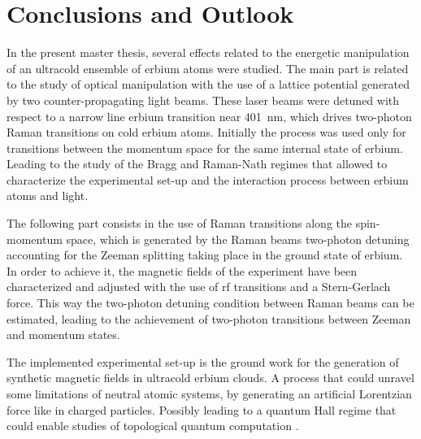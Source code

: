 
\chapter{Conclusions and Outlook}
\label{chap:outlook}

In the present master thesis, several effects related to the energetic manipulation of an ultracold ensemble of erbium atoms were studied. The main part is related to the study of optical manipulation with the use of a lattice potential generated by two counter-propagating light beams. These laser beams were detuned with respect to a narrow line erbium transition near \SI{401}{\nano\meter}, which drives two-photon Raman transitions on cold erbium atoms. Initially the process was used only for transitions between the momentum space for the same internal state of erbium. Leading to the study of the Bragg and Raman-Nath regimes that allowed to characterize the experimental set-up and the interaction process between erbium atoms and light.

The following part consists in the use of Raman transitions along the spin-momentum space, which is generated by the Raman beams two-photon detuning accounting for the Zeeman splitting taking place in the ground state of erbium. In order to achieve it, the magnetic fields of the experiment have been characterized and adjusted with the use of \acl{rf} transitions and a Stern-Gerlach force. This way the two-photon detuning condition between Raman beams can be estimated, leading to the achievement of two-photon transitions between Zeeman and momentum states.

The implemented experimental set-up is the ground work for the generation of synthetic magnetic fields in ultracold erbium clouds. A process that could unravel some limitations of neutral atomic systems, by generating an artificial Lorentzian force like in charged particles. Possibly leading to a quantum Hall regime that could enable studies of topological quantum computation \cite{Lin2009}.



